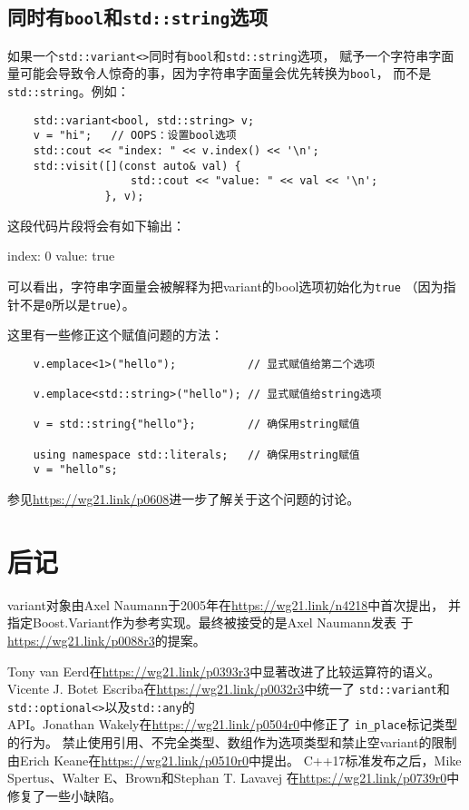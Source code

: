 \subsection{同时有\texttt{bool}和\texttt{std::string}选项}
如果一个\texttt{std::variant<>}同时有\texttt{bool}和\texttt{std::string}选项，
赋予一个字符串字面量可能会导致令人惊奇的事，因为字符串字面量会优先转换为\texttt{bool}，
而不是\texttt{std::string}。例如：
\begin{lstlisting}
    std::variant<bool, std::string> v;
    v = "hi";   // OOPS：设置bool选项
    std::cout << "index: " << v.index() << '\n';
    std::visit([](const auto& val) {
                   std::cout << "value: " << val << '\n';
               }, v);
\end{lstlisting}
这段代码片段将会有如下输出：
\begin{blacklisting}
    index: 0
    value: true
\end{blacklisting}
可以看出，字符串字面量会被解释为把variant的bool选项初始化为\texttt{true}
（因为指针不是\texttt{0}所以是\texttt{true}）。

这里有一些修正这个赋值问题的方法：
\begin{lstlisting}
    v.emplace<1>("hello");           // 显式赋值给第二个选项

    v.emplace<std::string>("hello"); // 显式赋值给string选项

    v = std::string{"hello"};        // 确保用string赋值

    using namespace std::literals;   // 确保用string赋值
    v = "hello"s;
\end{lstlisting}
参见\url{https://wg21.link/p0608}进一步了解关于这个问题的讨论。


\section{后记}
variant对象由Axel Naumann于2005年在\url{https://wg21.link/n4218}中首次提出，
并指定Boost.Variant作为参考实现。最终被接受的是Axel Naumann发表
于\url{https://wg21.link/p0088r3}的提案。

Tony van Eerd在\url{https://wg21.link/p0393r3}中显著改进了比较运算符的语义。
Vicente J. Botet Escriba在\url{https://wg21.link/p0032r3}中统一了
\texttt{std::variant}和\texttt{std::optional<>}以及\texttt{std::any}的\\
API。Jonathan Wakely在\url{https://wg21.link/p0504r0}中修正了
\texttt{in\_place}标记类型的行为。
禁止使用引用、不完全类型、数组作为选项类型和禁止空variant的限制
由Erich Keane在\url{https://wg21.link/p0510r0}中提出。
C++17标准发布之后，Mike Spertus、Walter E、Brown和Stephan T. Lavavej
在\url{https://wg21.link/p0739r0}中修复了一些小缺陷。